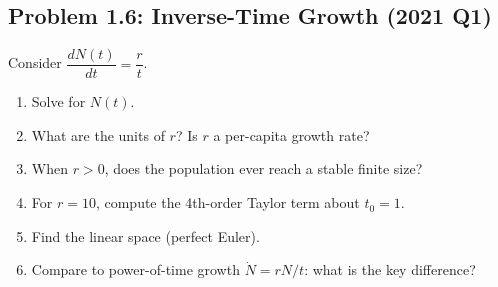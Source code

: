 \documentclass[10pt]{article}
\begin{document}
\subsection{Problem 1.6: Inverse-Time Growth (2021 Q1)}

\begin{problem}
Consider $\dfrac{dN(t)}{dt} = \dfrac{r}{t}$.

\begin{enumerate}[label=(\alph*)]
\item Solve for $N(t)$.
\item What are the units of $r$? Is $r$ a per-capita growth rate?
\item When $r > 0$, does the population ever reach a stable finite size?
\item For $r = 10$, compute the 4th-order Taylor term about $t_0 = 1$.
\item Find the linear space (perfect Euler).
\item Compare to power-of-time growth $\dot N = rN/t$: what is the key difference?
\end{enumerate}
\end{problem}
\end{document}
